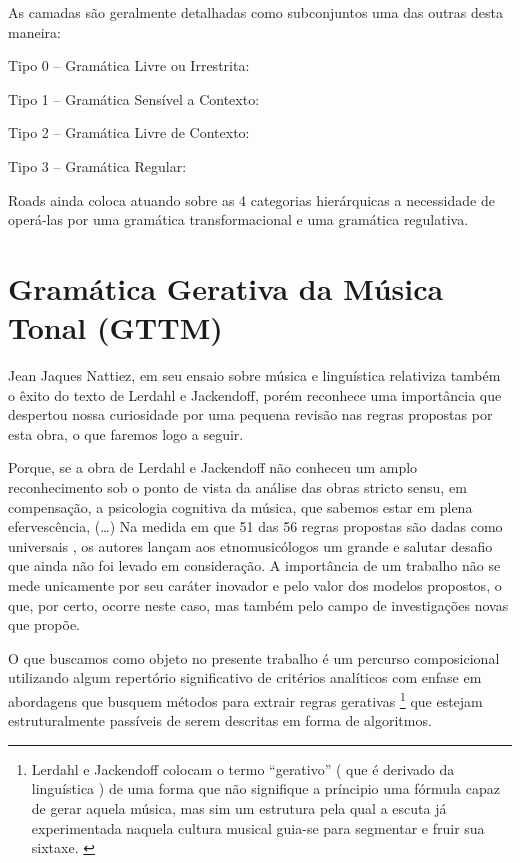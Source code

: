 \documentclass[
	12pt,				%
	openright,			%
	twoside,			%
	a4paper,			%
	english,			%
	french,				%
	spanish,			%
	brazil				%
	]{abntex2}
\begin{document}
As camadas são geralmente detalhadas como subconjuntos uma das outras desta maneira:

Tipo 0 – Gramática Livre ou Irrestrita:

Tipo 1 – Gramática Sensível a Contexto:

Tipo 2 – Gramática Livre de Contexto:

Tipo 3 – Gramática Regular:


Roads ainda coloca atuando sobre as 4 categorias hierárquicas a necessidade de operá-las por uma gramática transformacional e uma gramática regulativa.

\section{Gramática Gerativa da Música Tonal (GTTM)}
\label{GTTM}

Jean Jaques Nattiez, em seu ensaio sobre música e linguística \cite{nattiez2004modelos} relativiza também o êxito do texto de Lerdahl e Jackendoff, porém reconhece uma importância  que despertou nossa curiosidade por uma pequena revisão nas regras propostas por esta obra, o que faremos logo a seguir.

\begin{citacao}
Porque, se a obra de Lerdahl e Jackendoff não conheceu um amplo reconhecimento sob o ponto de vista da análise das obras stricto sensu, em compensação, a psicologia cognitiva da música, que sabemos estar em plena efervescência, (…) Na medida em que 51 das 56 regras propostas são dadas como universais \cite[ p.345-352]{lerdahl1983generative}, os autores lançam aos etnomusicólogos um grande e salutar desafio que ainda não foi levado em consideração. A importância de um trabalho não se mede unicamente por seu caráter inovador e pelo valor dos modelos propostos, o que, por certo, ocorre neste caso, mas também pelo campo de investigações novas que propõe.
\cite{nattiez2004modelos}
\end{citacao}


O que buscamos como objeto no presente trabalho é um percurso composicional utilizando algum repertório significativo de critérios analíticos com enfase em abordagens que busquem métodos para extrair regras gerativas
\footnote{
Lerdahl e Jackendoff colocam o termo “gerativo” ( que é derivado da linguística ) de uma forma que não signifique a príncipio uma fórmula capaz de gerar aquela música, mas sim um estrutura pela qual a escuta já experimentada naquela cultura musical guia-se para segmentar e fruir sua sixtaxe. \cite[ p.6]{lerdahl1983generative}
}
que estejam estruturalmente passíveis de serem descritas em forma de algoritmos. 
\end{document}
